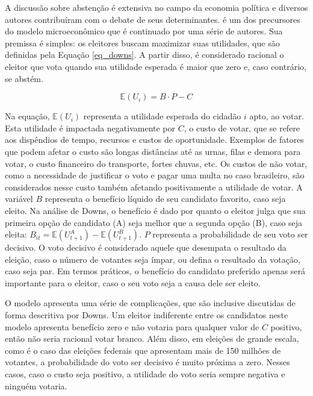 A discussão sobre abstenção é extensiva no campo da economia política e diversos autores contribuíram com o debate de seus determinantes. \textcite{downs1957economic} é um dos precursores do modelo microeconômico que é continuado por uma série de autores. Sua premissa é simples: os eleitores buscam maximizar suas utilidades, que são definidas pela Equação \ref{eq_downs}. A partir disso, é considerado racional o eleitor que vota quando sua utilidade esperada é maior que zero e, caso contrário, se abstém. 

\begin{equation}
\label{eq_downs}
    \mathbb{E}(U_i)=B\cdot P-C
\end{equation}

Na equação, $\mathbb{E}(U_i)$ representa a utilidade esperada do cidadão $i$ apto, ao votar. Esta utilidade é impactada negativamente por $C$, o custo de votar, que se refere aos dispêndios de tempo, recursos e custos de oportunidade. Exemplos de fatores que podem afetar o custo são longas distâncias até as urnas, filas e demora para votar, o custo financeiro do transporte, fortes chuvas, etc. Os custos de não votar, como a necessidade de justificar o voto e pagar uma multa no caso brasileiro, são considerados nesse custo também afetando positivamente a utilidade de votar. A variável $B$ representa o benefício líquido de seu candidato favorito, caso seja eleito. Na análise de Downs, o benefício é dado por quanto o eleitor julga que sua primeira opção de candidato (A) seja melhor que a segunda opção (B), caso seja eleita: $B_{it} = \mathbb{E}(U^A_{t+1})-\mathbb{E}(U^B_{t+1})$. $P$ representa a probabilidade de seu voto ser decisivo. O voto decisivo é considerado aquele que desempata o resultado da eleição, caso o número de votantes seja ímpar, ou defina o resultado da votação, caso seja par. Em termos práticos, o benefício do candidato preferido apenas será importante para o eleitor, caso o seu voto seja a causa dele ser eleito.

O modelo apresenta uma série de complicações, que são inclusive discutidas de forma descritiva por Downs. Um eleitor indiferente entre os candidatos neste modelo apresenta benefício zero e não votaria para qualquer valor de $C$ positivo, então não seria racional votar branco. Além disso, em eleições de grande escala, como é o caso das eleições federais que apresentam mais de 150 milhões de votantes, a probabilidade do voto ser decisivo é muito próxima a zero. Nesses casos, caso o custo seja positivo, a utilidade do voto seria sempre negativa e ninguém votaria.


